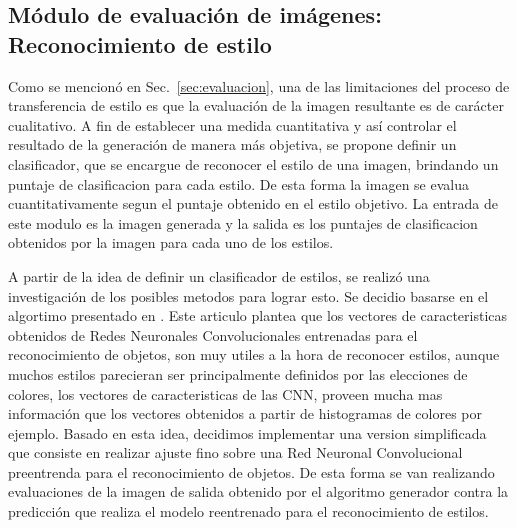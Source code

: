 \documentclass[a4paper,11pt,spanish]{book}
\begin{document}
    \subsection{Módulo de evaluación de imágenes: Reconocimiento de estilo \label{sec:evaluador}}
      Como se mencionó en Sec.~\ref{sec:evaluacion}, una de las limitaciones del proceso de transferencia de estilo es que la evaluación de
      la imagen resultante es de carácter cualitativo. A fin de establecer una medida cuantitativa y así controlar el resultado de la generación de
      manera más objetiva, se propone definir un clasificador, que se encargue de reconocer el estilo de una imagen, brindando un puntaje de clasificacion para cada estilo.
      De esta forma la imagen se evalua cuantitativamente segun el puntaje obtenido en el estilo objetivo.
      La entrada de este modulo es la imagen generada y la salida es los puntajes de clasificacion obtenidos por la imagen para cada uno de los estilos.

      A partir de la idea de definir un clasificador de estilos, se realizó una investigación de los posibles metodos para lograr esto. Se decidio basarse en el algortimo presentado en \cite{Karayev:Style_Recognition}.
      Este articulo plantea que los vectores de caracteristicas obtenidos de Redes Neuronales Convolucionales entrenadas para el reconocimiento de objetos, son muy utiles a la hora de
      reconocer estilos, aunque muchos estilos parecieran ser principalmente definidos por las elecciones de colores, los vectores de caracteristicas de las CNN, proveen mucha mas información
      que los vectores obtenidos a partir de histogramas de colores por ejemplo.
      Basado en esta idea, decidimos implementar una version simplificada que consiste en realizar ajuste fino sobre una Red Neuronal Convolucional preentrenda para el reconocimiento de objetos.
      De esta forma se van realizando evaluaciones de la imagen de salida obtenido por el algoritmo generador contra la predicción que realiza el modelo reentrenado para el reconocimiento de estilos.
\end{document}
